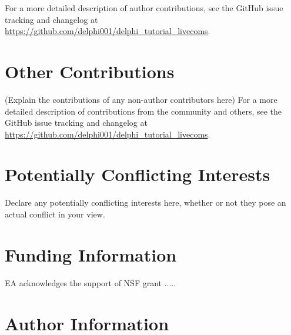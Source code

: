 \documentclass[9pt,tutorial]{livecoms}
\newcommand{\githubrepository}{\url{https://github.com/delphi001/delphi_tutorial_livecoms}}  %
\begin{document}
For a more detailed description of author contributions,
see the GitHub issue tracking and changelog at \githubrepository.

\section{Other Contributions}
%

(Explain the contributions of any non-author contributors here)
For a more detailed description of contributions from the community and others, see the GitHub issue tracking and changelog at \githubrepository.

\section{Potentially Conflicting Interests}

Declare any potentially conflicting interests here, whether or not they pose an actual conflict in your view.

\section{Funding Information}
EA acknowledges the support of NSF grant .....

\section*{Author Information}
\makeorcid




\end{document}
